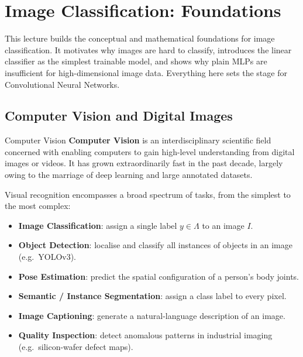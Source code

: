 \documentclass[11pt,a4paper]{article}
\begin{document}
\section{Image Classification: Foundations}
\label{sec:image_classification}

This lecture builds the conceptual and mathematical foundations for image classification.
It motivates why images are hard to classify, introduces the linear classifier as the simplest
trainable model, and shows why plain MLPs are insufficient for high-dimensional image data.
Everything here sets the stage for Convolutional Neural Networks.

\subsection{Computer Vision and Digital Images}
\label{sec:cv_digital_images}

\begin{defbox}{Computer Vision}
\textbf{Computer Vision} is an interdisciplinary scientific field concerned with enabling computers
to gain high-level understanding from digital images or videos.  It has grown extraordinarily fast in
the past decade, largely owing to the marriage of deep learning and large annotated datasets.
\end{defbox}

Visual recognition encompasses a broad spectrum of tasks, from the simplest to the most complex:
\begin{itemize}
  \item \textbf{Image Classification}: assign a single label $y \in \Lambda$ to an image $I$.
  \item \textbf{Object Detection}: localise and classify all instances of objects in an image (e.g.\ YOLOv3).
  \item \textbf{Pose Estimation}: predict the spatial configuration of a person's body joints.
  \item \textbf{Semantic / Instance Segmentation}: assign a class label to every pixel.
  \item \textbf{Image Captioning}: generate a natural-language description of an image.
  \item \textbf{Quality Inspection}: detect anomalous patterns in industrial imaging (e.g.\ silicon-wafer defect maps).
\end{itemize}
\end{document}
